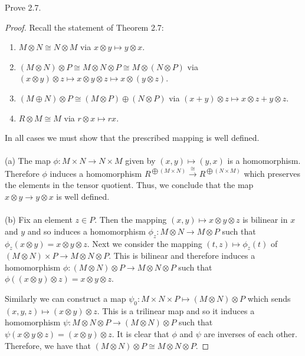 \newpage
\begin{problem}
Prove 2.7.
\end{problem}
\begin{proof}
Recall the statement of Theorem 2.7:
\begin{theorem*}
\begin{enumerate}[noitemsep,label=(\alph*)]
\item $M\otimes N\cong N\otimes M$ via $x\otimes y\mapsto
  y\otimes x$.
\item $(M\otimes N)\otimes P\cong M\otimes N\otimes
  P\cong M\otimes(N\otimes P)$ via $(x\otimes y)\otimes
  z\mapsto x\otimes y\otimes z\mapsto x\otimes (y\otimes z)$.
\item $(M\oplus N)\otimes P\cong (M\otimes P)\oplus
  (N\otimes P)$ via $(x+y)\otimes z\mapsto x\otimes z+y\otimes
  z$.
\item $R\otimes M\cong M$ via $r\otimes x\mapsto rx$.
\end{enumerate}
\end{theorem*}
\vspace{.25in}
\noindent
In all cases we must show that the prescribed mapping is well
defined.
\\\\
(a) The map $\phi\colon M\times N\to N\times M$ given by
$(x,y)\mapsto(y,x)$ is a homomorphism. Therefore $\phi$ induces a
homomorphism $R^{\bigoplus (M\times
  N)}\overset{\cong}{\longrightarrow}R^{\bigoplus(N\times M)}$
which preserves the elements in the tensor quotient. Thus, we
conclude that the map $x\otimes y\to y\otimes x$ is well
defined.
\\\\
(b) Fix an element $z\in P$. Then the mapping $(x,y)\mapsto
x\otimes y\otimes z$ is bilinear in $x$ and $y$ and so induces a
homomorphism $\phi_z\colon M\otimes N\to M\otimes P$ such
that $\phi_z(x\otimes y)=x\otimes y\otimes z$. Next we consider
the mapping $(t,z)\mapsto\phi_z(t)$ of $(M\otimes N)\times P\to
M\otimes N\otimes P$. This is bilinear and therefore induces a
homomorphism $\phi\colon (M\otimes N)\otimes P\to M\otimes
N\otimes P$ such that $\phi((x\otimes y)\otimes z)=x\otimes
y\otimes z$.

Similarly we can construct a map $\psi_0\colon M\times N\times
P\mapsto (M\otimes N)\otimes P$ which sends $(x,y,z)\mapsto
(x\otimes y)\otimes z$. This is a trilinear map and so it induces
a homomorphism $\psi\colon M\otimes N\otimes P\to(M\otimes
N)\otimes P$ such that $\psi(x\otimes y\otimes z)=(x\otimes
y)\otimes z$. It is clear that $\phi$ and $\psi$ are inverses of
each other. Therefore, we have that $(M\otimes N)\otimes P\cong
M\otimes N\otimes P$.


\end{proof}
